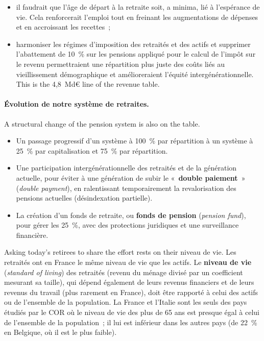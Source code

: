 \begin{itemize}
\begin{itemize}
      \item il faudrait que l'âge de départ à la retraite soit, a minima, lié à
        l'espérance de vie. Cela renforcerait l'emploi tout en freinant les
        augmentations de dépenses et en accroissant les recettes~;
      \item harmoniser les régimes d'imposition des retraités et des actifs et
        supprimer l'abattement de 10~\% sur les pensions appliqué pour le calcul
        de l'impôt sur le revenu permettraient une répartition plus juste des
        coûts liés au vieillissement démographique et amélioreraient l'équité
        intergénérationnelle. This is the 4,8~Md€ line of the revenue table.
    \end{itemize}
\end{itemize}

\paragraph{Évolution de notre système de retraites.}
A structural change of the pension system is also on the table.
\begin{itemize}
  \item Un passage progressif d'un système à 100~\% par répartition à un système
    à 25~\% par capitalisation et 75~\% par répartition.
  \item Une participation intergénérationnelle des retraités et de la
    génération actuelle, pour éviter à une génération de subir le
    «~\textbf{double paiement}~» (\textit{double payment}), en ralentissant
    temporairement la revalorisation des pensions actuelles (désindexation
    partielle).
  \item La création d'un fonds de retraite, ou \textbf{fonds de pension}
    (\textit{pension fund}), pour gérer les 25~\%, avec des protections
    juridiques et une surveillance financière.
\end{itemize}
Asking today's retirees to share the effort rests on their niveau de vie.
Les retraités ont en France le même niveau de vie que les actifs. Le
\textbf{niveau de vie} (\textit{standard of living}) des
retraités (revenu du ménage divisé par un coefficient mesurant sa taille), qui
dépend également de leurs revenus financiers et de leurs revenus du travail
(plus rarement en France), doit être rapporté à celui des actifs ou de
l'ensemble de la population. La France et l'Italie sont les seuls des pays
étudiés par le COR où le niveau de vie des plus de 65 ans est presque égal à
celui de l'ensemble de la population~; il lui est inférieur dans les autres pays
(de 22~\% en Belgique, où il est le plus faible).

